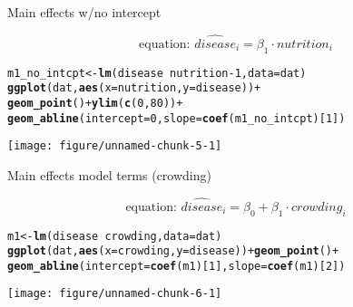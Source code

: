 \documentclass[table]{beamer}\usepackage[]{graphicx}\usepackage[]{color}
\makeatletter
\def\maxwidth{ %
  \ifdim\Gin@nat@width>\linewidth
    \linewidth
  \else
    \Gin@nat@width
  \fi
}
\newcommand{\hlnum}[1]{\textcolor[rgb]{0.686,0.059,0.569}{#1}}%
\newcommand{\hlopt}[1]{\textcolor[rgb]{0,0,0}{#1}}%
\newcommand{\hlstd}[1]{\textcolor[rgb]{0.345,0.345,0.345}{#1}}%
\newcommand{\hlkwb}[1]{\textcolor[rgb]{0.69,0.353,0.396}{#1}}%
\newcommand{\hlkwc}[1]{\textcolor[rgb]{0.333,0.667,0.333}{#1}}%
\newcommand{\hlkwd}[1]{\textcolor[rgb]{0.737,0.353,0.396}{\textbf{#1}}}%
\newenvironment{kframe}{%
 \def\at@end@of@kframe{}%
 \ifinner\ifhmode%
  \def\at@end@of@kframe{\end{minipage}}%
  \begin{minipage}{\columnwidth}%
 \fi\fi%
 \def\FrameCommand##1{\hskip\@totalleftmargin \hskip-\fboxsep
 \colorbox{shadecolor}{##1}\hskip-\fboxsep
     \hskip-\linewidth \hskip-\@totalleftmargin \hskip\columnwidth}%
 \MakeFramed {\advance\hsize-\width
   \@totalleftmargin\z@ \linewidth\hsize
   \@setminipage}}%
 {\par\unskip\endMakeFramed%
 \at@end@of@kframe}
\newenvironment{knitrout}{}{} %
\makeatother
\begin{document}
\begin{frame}[fragile]{Main effects w/no intercept}

$$ \mbox{equation: \ }  \widehat{disease}_i = \beta_1\cdot nutrition_i $$

\begin{knitrout}\scriptsize
{}\color{fgcolor}\begin{kframe}
\begin{alltt}
\hlstd{m1_no_intcpt} \hlkwb{<-} \hlkwd{lm}\hlstd{(disease} \hlopt{~} \hlstd{nutrition} \hlopt{-} \hlnum{1}\hlstd{,} \hlkwc{data}\hlstd{=dat)}
\hlkwd{ggplot}\hlstd{(dat,} \hlkwd{aes}\hlstd{(}\hlkwc{x}\hlstd{=nutrition,} \hlkwc{y}\hlstd{=disease))} \hlopt{+}
  \hlkwd{geom_point}\hlstd{()} \hlopt{+} \hlkwd{ylim}\hlstd{(}\hlkwd{c}\hlstd{(}\hlnum{0}\hlstd{,}\hlnum{80}\hlstd{))} \hlopt{+}
  \hlkwd{geom_abline}\hlstd{(}\hlkwc{intercept} \hlstd{=} \hlnum{0}\hlstd{,} \hlkwc{slope} \hlstd{=} \hlkwd{coef}\hlstd{(m1_no_intcpt)[}\hlnum{1}\hlstd{])}
\end{alltt}
\end{kframe}
\texttt{[image: figure/unnamed-chunk-5-1]} 
\end{knitrout}

\end{frame}


\begin{frame}[fragile]{Main effects model terms (crowding)}

$$ \mbox{equation: \ }  \widehat{disease}_i = \beta_0 + \beta_1\cdot crowding_i $$

\begin{knitrout}\scriptsize
{}\color{fgcolor}\begin{kframe}
\begin{alltt}
\hlstd{m1} \hlkwb{<-} \hlkwd{lm}\hlstd{(disease} \hlopt{~} \hlstd{crowding,} \hlkwc{data}\hlstd{=dat)}
\hlkwd{ggplot}\hlstd{(dat,} \hlkwd{aes}\hlstd{(}\hlkwc{x}\hlstd{=crowding,} \hlkwc{y}\hlstd{=disease))} \hlopt{+} \hlkwd{geom_point}\hlstd{()} \hlopt{+}
  \hlkwd{geom_abline}\hlstd{(}\hlkwc{intercept} \hlstd{=} \hlkwd{coef}\hlstd{(m1)[}\hlnum{1}\hlstd{],} \hlkwc{slope} \hlstd{=} \hlkwd{coef}\hlstd{(m1)[}\hlnum{2}\hlstd{])}
\end{alltt}
\end{kframe}
\texttt{[image: figure/unnamed-chunk-6-1]} 
\end{knitrout}

\end{frame}
\end{document}
